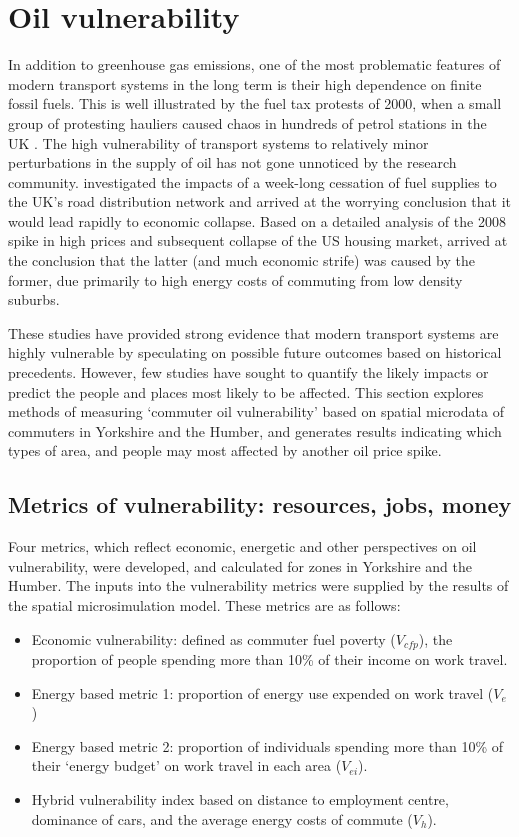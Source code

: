 \documentclass[a4paper, 11pt, twoside]{Thesis}
\begin{document}
\section{Oil vulnerability} \label{svul}
In addition to greenhouse gas emissions, one of the most problematic features
of modern transport systems in the long term is their high dependence on finite
fossil fuels. This is well illustrated by the fuel tax protests of 2000, when
a small group of protesting hauliers caused chaos in hundreds of petrol
stations in the UK \citep{Lyons2002}.
The high vulnerability of transport systems to relatively minor perturbations
in the supply of oil has not gone unnoticed by the research community.
\citet{McKinnon2006} investigated the impacts of a week-long cessation of
fuel supplies to the UK's road distribution network and arrived at the worrying
conclusion that it would lead rapidly to economic collapse. 
Based on a detailed analysis of the 2008 spike in high prices and subsequent
collapse of the US housing market, \citet{Sexton2011} arrived at the conclusion
that the latter (and much economic strife) was caused by the former, due
primarily to high energy costs of commuting from low density suburbs.

These studies have provided strong evidence that modern transport systems
are highly vulnerable by speculating on possible future outcomes based on
historical precedents. However, few studies have sought to {quantify} the
likely impacts or predict the people and places most likely to be affected.
This section explores methods of measuring `commuter oil vulnerability' based
on spatial microdata of commuters in Yorkshire and the Humber, and generates
results indicating which types of area, and people may most affected by another
oil price spike.






\subsection{Metrics of vulnerability: resources, jobs, money}
\label{metrics}
Four metrics, which reflect economic, energetic and other
perspectives on oil vulnerability, were developed, and calculated
for zones in Yorkshire and the Humber. The inputs into the vulnerability
metrics were supplied by the results of the spatial microsimulation model.
These metrics are as follows:
\begin{itemize}
 \item Economic vulnerability: defined as commuter fuel poverty ($V_{cfp}$),
the proportion of people spending more
than 10\% of their income on work travel.
\item Energy based metric 1: proportion of energy use expended on
work travel ($V_e$)
\item Energy based metric 2: proportion of individuals
spending more than 10\% of their `energy
budget' on work travel in each area ($V_{ei}$).
\item Hybrid vulnerability index based on distance to employment centre,
dominance of cars, and the average energy costs of commute ($V_h$).
\end{itemize}
\end{document}
